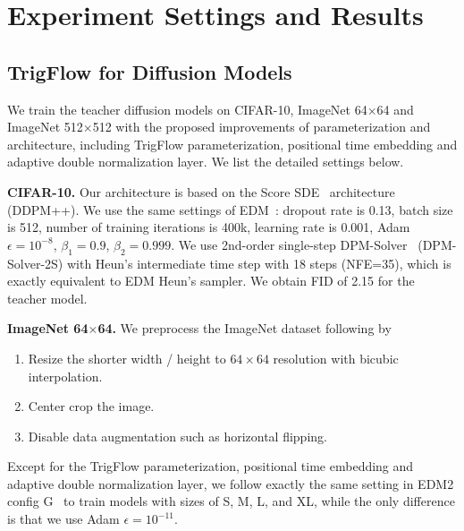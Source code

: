 \section{Experiment Settings and Results}
\label{appendix:exp}


\subsection{TrigFlow for Diffusion Models}
\label{appendix:exp:trigflow_diffusion}

We train the teacher diffusion models on CIFAR-10, ImageNet 64$\times$64 and ImageNet 512$\times$512 with the proposed improvements of parameterization and architecture, including TrigFlow parameterization, positional time embedding and adaptive double normalization layer. We list the detailed settings below.

\textbf{CIFAR-10. }
Our architecture is based on the Score SDE~\citep{song2020score} architecture (DDPM++). We use the same settings of EDM~\citep{karras2022edm}: dropout rate is 0.13, batch size is 512, number of training iterations is 400k, learning rate is 0.001, Adam $\epsilon=10^{-8}$, $\beta_1=0.9$, $\beta_2=0.999$. We use 2nd-order single-step DPM-Solver~\citep{lu2022dpm} (DPM-Solver-2S) with Heun's intermediate time step with 18 steps (NFE=35), which is exactly equivalent to EDM Heun's sampler. We obtain FID of 2.15 for the teacher model.

\textbf{ImageNet 64$\times$64. }
We preprocess the ImageNet dataset following \citet{diffusion_beat_gan} by
\begin{enumerate}
    \item Resize the shorter width / height to $64\times64$ resolution with bicubic interpolation.
    \item Center crop the image.
    \item Disable data augmentation such as horizontal flipping.
\end{enumerate}
Except for the TrigFlow parameterization, positional time embedding and adaptive double normalization layer, we follow exactly the same setting in EDM2 config G~\citep{karras2024edm2} to train models with sizes of S, M, L, and XL, while the only difference is that we use Adam $\epsilon=10^{-11}$.

